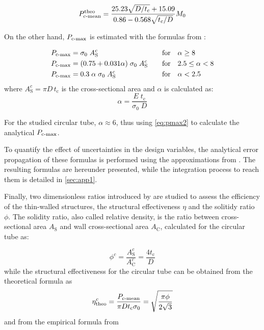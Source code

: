 \documentclass[12pt,number,preprint,review,times]{elsarticle}
\begin{document}
\begin{equation}
\centering
    P^{\mathrm{theo}}_{\mathrm{c{\text -}mean}} = \frac{25.23\sqrt{D/t_\mathrm{c}}+15.09}{0.86-0.568\sqrt{t_\mathrm{c}/D}}M_0
\label{eq:pmean_theo}
\end{equation}

On the other hand, $P_{\mathrm{c{\text -}max}}$ is estimated with the formulas from \citet{plantema1964collapsing}:

\begin{align}
P_{\mathrm{c{\text -}max}} &= \sigma_0 \; {A^c_{\mathrm{S}}}&& \quad \mathrm{for} \quad \alpha \geq 8 \label{eq:pmax1}\\ 
P_{\mathrm{c{\text -}max}} &= (0.75 + 0.031 \alpha) \; \sigma_0 \; {A^c_{\mathrm{S}}}&& \quad \mathrm{for} \quad 2.5 \leq \alpha < 8 \label{eq:pmax2}\\ 
P_{\mathrm{c{\text -}max}} &=  0.3 \; \alpha  \; \sigma_0 \; {A^c_{\mathrm{S}}}&& \quad \mathrm{for} \quad \alpha < 2.5
\label{eq:pmax3}
\end{align}
where ${A^c_{\mathrm{S}}} =  \pi D \, t_\mathrm{c} $ is the cross-sectional area and $\alpha$ is calculated as:
\begin{equation}
\alpha = \frac{E \; t_\mathrm{c}}{\sigma_0 \; D}
\end{equation}

For the studied circular tube, $\alpha \approx 6$, thus using \cref{eq:pmax2} to calculate the analytical $P_{\mathrm{c{\text -}max}}$.


To quantify the effect of uncertainties in the design variables, the analytical error propagation of these formulas is performed using the approximations from \citet{hendeby2007nonlinear}. The resulting formulas are hereunder presented, while the integration process to reach them is detailed in \cref{sec:app1}.

Finally, two dimensionless ratios introduced by \citet{pugsley1960crumpling} are studied to assess the efficiency of the thin-walled structures, the structural effectiveness $\eta$ and the solitidy ratio $\phi$. The solidity ratio, also called relative density, is the ratio between cross-sectional area ${A_{\mathrm{S}}}$ and wall cross-sectional area $A_\mathrm{C}$, calculated for the circular tube as: 

\begin{equation}
\phi^c = \frac{A^c_{\mathrm{S}}}{A^c_\mathrm{C}} = \frac{4 t_\mathrm{c}}{D}
\end{equation}
while the structural effectiveness for the circular tube can be obtained from the theoretical formula as
\begin{equation}
\eta_{\mathrm{theo}}^c = \frac{P_{\mathrm{c{\text -}mean}}}{\pi D t_\mathrm{c} \sigma_0 } = \sqrt{ \frac{\pi \phi}{2 \sqrt{3}}  }
\end{equation}
and from the empirical formula from \citet{thornton1983energy}
\end{document}
